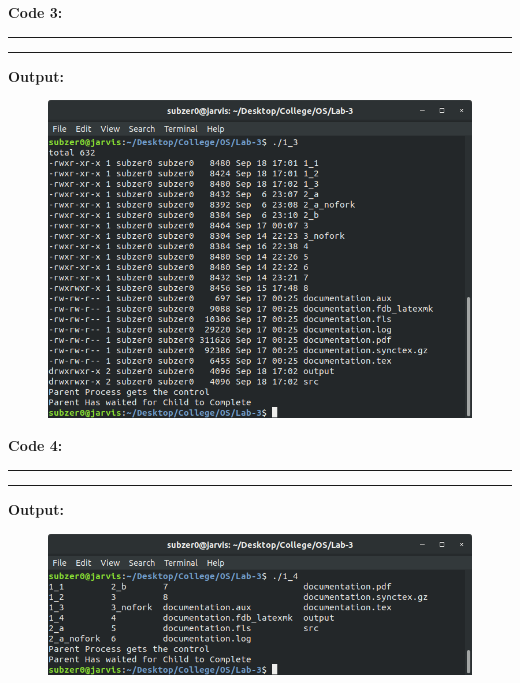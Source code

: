 \documentclass{article}
\begin{document}
\noindent
\textbf{\LARGE Code 3:}
\smallskip
\par\noindent\rule{\textwidth}{0.4pt}

\par\noindent\rule{\textwidth}{0.4pt}

\bigskip
\noindent
\textbf{\LARGE Output:}

\begin{figure}[ht]
    \includegraphics[width=\textwidth]{output/1_3.png}
\end{figure}
\bigskip
\bigskip
\bigskip

\noindent
\textbf{\LARGE Code 4:}
\smallskip
\par\noindent\rule{\textwidth}{0.4pt}

\par\noindent\rule{\textwidth}{0.4pt}

\bigskip
\noindent
\textbf{\LARGE Output:}
\\
\begin{figure}[h]
    \includegraphics[width=\textwidth]{output/1_4.png}
\end{figure}

\bigskip
\bigskip
\bigskip
\end{document}
